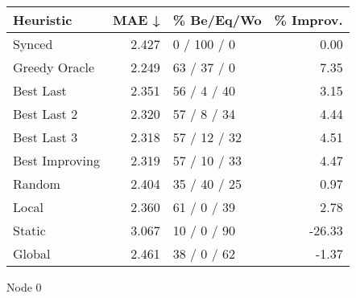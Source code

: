 \begin{tabular}{lrlr}
\toprule
\textbf{Heuristic} & \textbf{MAE ↓} & \textbf{\% Be/Eq/Wo} & \textbf{\% Improv.} \\
\midrule
            Synced &          2.427 &          0 / 100 / 0 &                0.00 \\
     Greedy Oracle &          2.249 &          63 / 37 / 0 &                7.35 \\
         Best Last &          2.351 &          56 / 4 / 40 &                3.15 \\
       Best Last 2 &          2.320 &          57 / 8 / 34 &                4.44 \\
       Best Last 3 &          2.318 &         57 / 12 / 32 &                4.51 \\
    Best Improving &          2.319 &         57 / 10 / 33 &                4.47 \\
            Random &          2.404 &         35 / 40 / 25 &                0.97 \\
             Local &          2.360 &          61 / 0 / 39 &                2.78 \\
            Static &          3.067 &          10 / 0 / 90 &              -26.33 \\
            Global &          2.461 &          38 / 0 / 62 &               -1.37 \\
\bottomrule
\end{tabular}
\caption{Node 0}
\label{tab:ds_non_lr05_le2_bs2_0}
